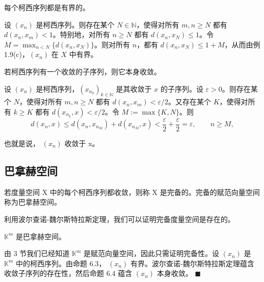 \begin{proposition}

每个柯西序列都是有界的。

\proofhead
设 $(x_n)$ 是柯西序列。则存在某个 $N \in \mathbb{N}$，使得对所有 $m, n \geq N$ 都有 $d(x_n, x_m) < 1$。特别地，对所有 $n \geq N$ 都有 $d(x_n, x_N) \leq 1$。令 $M = \max_{n < N} \{d(x_n, x_N)\}$。则对所有 $n$，都有 $d(x_n, x_N) \leq 1 + M$，从而由例 1.9(c)，$(x_n)$ 在 $X$ 中有界。
\end{proposition}

\begin{proposition}

若柯西序列有一个收敛的子序列，则它本身收敛。

\proofhead
设 $(x_n)$ 是柯西序列，$(x_{n_k})_{k\in\mathbb{N}}$ 是其收敛于 $x$ 的子序列。设 $\varepsilon > 0$。则存在某个 $N$，使得对所有 $m, n \geq N$ 都有 $d(x_n, x_m) < \varepsilon/2$。又存在某个 $K$，使得对所有 $k \geq K$ 都有 $d(x_{n_k}, x) < \varepsilon/2$。令 $M := \max\{K, N\}$。则
\[
d(x_{n},x)\leq d(x_{n},x_{n_{M}})+d(x_{n_{M}},x)<\frac{\varepsilon}{2}+\frac{\varepsilon}{2}=\varepsilon,\qquad n\geq M,
\]

也就是说， $ (x_{n}) $ 收敛于 x。

\end{proposition}

\subsection*{巴拿赫空间}

若度量空间 X 中的每个柯西序列都收敛，则称 X 是完备的。完备的赋范向量空间称为巴拿赫空间。

利用波尔查诺-魏尔斯特拉斯定理，我们可以证明完备度量空间是存在的。

\begin{theorem}

$ \mathbb{K}^{m} $ 是巴拿赫空间。

\proofhead
由 3 节我们已经知道  $ \mathbb{K}^m $ 是赋范向量空间，因此只需证明完备性。设  $ (x_n) $ 是  $ \mathbb{K}^m $ 中的柯西序列。由命题 6.3， $ (x_n) $ 有界。波尔查诺-魏尔斯特拉斯定理蕴含收敛子序列的存在性，然后命题 6.4 蕴含  $ (x_n) $ 本身收敛。 $ \blacksquare $
\end{theorem}

